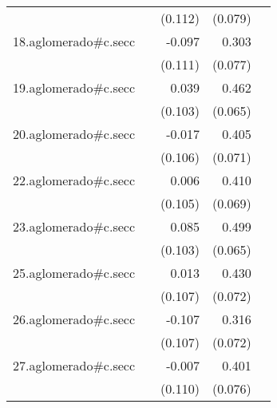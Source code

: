 {\begin{longtable}{l*{4}{D{.}{.}{-1}}}
            &                     &     (0.112)         &     (0.079)         &                     \\
\addlinespace
18.aglomerado#c.secc&                     &      -0.097         &       0.303\sym{***}&                     \\
            &                     &     (0.111)         &     (0.077)         &                     \\
\addlinespace
19.aglomerado#c.secc&                     &       0.039         &       0.462\sym{***}&                     \\
            &                     &     (0.103)         &     (0.065)         &                     \\
\addlinespace
20.aglomerado#c.secc&                     &      -0.017         &       0.405\sym{***}&                     \\
            &                     &     (0.106)         &     (0.071)         &                     \\
\addlinespace
22.aglomerado#c.secc&                     &       0.006         &       0.410\sym{***}&                     \\
            &                     &     (0.105)         &     (0.069)         &                     \\
\addlinespace
23.aglomerado#c.secc&                     &       0.085         &       0.499\sym{***}&                     \\
            &                     &     (0.103)         &     (0.065)         &                     \\
\addlinespace
25.aglomerado#c.secc&                     &       0.013         &       0.430\sym{***}&                     \\
            &                     &     (0.107)         &     (0.072)         &                     \\
\addlinespace
26.aglomerado#c.secc&                     &      -0.107         &       0.316\sym{***}&                     \\
            &                     &     (0.107)         &     (0.072)         &                     \\
\addlinespace
27.aglomerado#c.secc&                     &      -0.007         &       0.401\sym{***}&                     \\
            &                     &     (0.110)         &     (0.076)         &                     \\

\end{longtable}}
